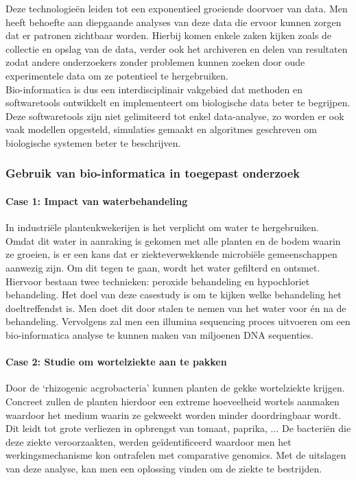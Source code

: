 \documentclass[a4paper,kul]{kulakarticle} %
\begin{document}
Deze technologieën leiden tot een exponentieel groeiende doorvoer van data. Men heeft behoefte aan diepgaande analyses van deze data die ervoor kunnen zorgen dat er patronen zichtbaar worden. Hierbij komen enkele zaken kijken zoals de collectie en opslag van de data, verder ook het archiveren en delen van resultaten zodat andere onderzoekers zonder problemen kunnen zoeken door oude experimentele data om ze potentieel te hergebruiken. %
\newline
\\
Bio-informatica is dus een interdisciplinair vakgebied dat methoden en softwaretools ontwikkelt en implementeert om biologische data beter te begrijpen. Deze softwaretools zijn niet gelimiteerd tot enkel data-analyse, zo worden er ook vaak modellen opgesteld, simulaties gemaakt en algoritmes geschreven om biologische systemen beter te beschrijven. 
\subsubsection{Gebruik van bio-informatica in toegepast onderzoek}
\paragraph{Case 1: Impact van waterbehandeling}
In industriële plantenkwekerijen is het verplicht om water te hergebruiken. Omdat dit water in aanraking is gekomen met alle planten en de bodem waarin ze groeien, is er een kans dat er ziekteverwekkende microbiële gemeenschappen aanwezig zijn. Om dit tegen te gaan, wordt het water gefilterd en ontsmet. Hiervoor bestaan twee technieken: peroxide behandeling en hypochloriet behandeling. Het doel van deze casestudy is om te kijken welke behandeling het doeltreffendst is. Men doet dit door stalen te nemen van het water voor én na de behandeling. Vervolgens zal men een illumina sequencing proces uitvoeren om een bio-informatica analyse te kunnen maken van miljoenen DNA sequenties.
\paragraph{Case 2: Studie om wortelziekte aan te pakken}
Door de `rhizogenic acgrobacteria' kunnen planten de gekke wortelziekte krijgen. Concreet zullen de planten hierdoor een extreme hoeveelheid wortels aanmaken waardoor het medium waarin ze gekweekt worden minder doordringbaar wordt. Dit leidt tot grote verliezen in opbrengst van tomaat, paprika, $\ldots$ De bacteriën die deze ziekte veroorzaakten, werden geïdentificeerd waardoor men het werkingsmechanisme kon ontrafelen met comparative genomics. Met de uitslagen van deze analyse, kan men een oplossing vinden om de ziekte te bestrijden. 
\newpage
\end{document}
